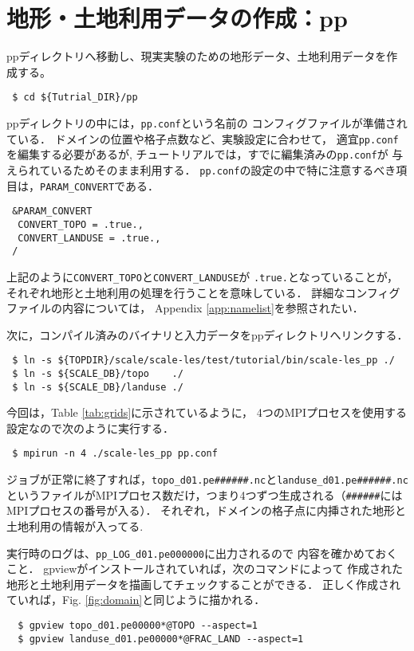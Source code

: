 
\section{地形・土地利用データの作成：pp}

ppディレクトリへ移動し、現実実験のための地形データ、土地利用データを作成する。
\begin{verbatim}
 $ cd ${Tutrial_DIR}/pp
\end{verbatim}
ppディレクトリの中には，\verb|pp.conf|という名前の
コンフィグファイルが準備されている．
ドメインの位置や格子点数など、実験設定に合わせて，
適宜\verb|pp.conf|を編集する必要があるが,
チュートリアルでは，すでに編集済みの\verb|pp.conf|が
与えられているためそのまま利用する．
\verb|pp.conf|の設定の中で特に注意するべき項目は，\verb|PARAM_CONVERT|である．
\begin{verbatim}
 &PARAM_CONVERT
  CONVERT_TOPO = .true.,
  CONVERT_LANDUSE = .true.,
 /
\end{verbatim}
上記のように\verb|CONVERT_TOPO|と\verb|CONVERT_LANDUSE|が
\verb|.true.|となっていることが，
それぞれ地形と土地利用の処理を行うことを意味している．
詳細なコンフィグファイルの内容については，
Appendix \ref{app:namelist}を参照されたい．

次に，コンパイル済みのバイナリと入力データをppディレクトリへリンクする．
\begin{verbatim}
 $ ln -s ${TOPDIR}/scale/scale-les/test/tutorial/bin/scale-les_pp ./
 $ ln -s ${SCALE_DB}/topo    ./
 $ ln -s ${SCALE_DB}/landuse ./
\end{verbatim}
今回は，Table \ref{tab:grids}に示されているように，
4つのMPIプロセスを使用する設定なので次のように実行する．
\begin{verbatim}
 $ mpirun -n 4 ./scale-les_pp pp.conf
\end{verbatim}
ジョブが正常に終了すれば，\verb|topo_d01.pe######.nc|と\verb|landuse_d01.pe######.nc|というファイルがMPIプロセス数だけ，つまり4つずつ生成される（\verb|######|にはMPIプロセスの番号が入る）．
それぞれ，ドメインの格子点に内挿された地形と土地利用の情報が入ってる.


実行時のログは、\verb|pp_LOG_d01.pe000000|に出力されるので
内容を確かめておくこと．
gpviewがインストールされていれば，次のコマンドによって
作成された地形と土地利用データを描画してチェックすることができる．
正しく作成されていれば，Fig. \ref{fig:domain}と同じように描かれる．
\begin{verbatim}
  $ gpview topo_d01.pe00000*@TOPO --aspect=1
  $ gpview landuse_d01.pe00000*@FRAC_LAND --aspect=1
\end{verbatim}

